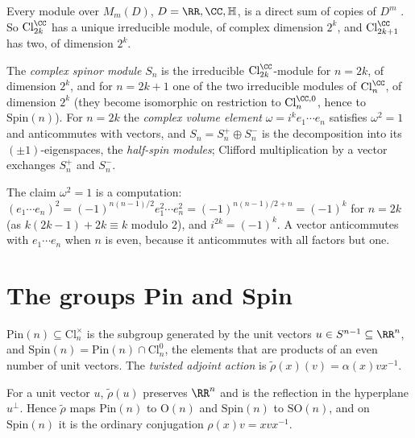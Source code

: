 Every module over $M_m(D)$, $D = \RR, \CC, \mathbb{H}$, is a direct sum of copies of $D^m$ \cite[Chapter I]{lawson-michelsohn}. So $\mathrm{Cl}^\CC_{2k}$ has a unique irreducible module, of complex dimension
$2^k$, and $\mathrm{Cl}^\CC_{2k+1}$ has two, of dimension $2^k$.

\begin{definition}\label{spin-geometry:definition-spinor-module}
The \emph{complex spinor module} $S_n$ is the irreducible $\mathrm{Cl}^\CC_{2k}$-module for $n = 2k$, of dimension $2^k$, and for $n = 2k + 1$ one of the two irreducible modules of $\mathrm{Cl}^\CC_n$, of dimension $2^k$ (they become isomorphic
on restriction to $\mathrm{Cl}^{\CC,0}_n$, hence to $\mathrm{Spin}(n)$). For $n = 2k$ the \emph{complex volume element} $\omega = i^ke_1\cdots e_n$ satisfies $\omega^2 = 1$ and anticommutes with vectors, and $S_n = S_n^+ \oplus S_n^-$ is the decomposition into its
$(\pm 1)$-eigenspaces, the \emph{half-spin modules}; Clifford multiplication by a vector exchanges $S^+_n$ and $S^-_n$.
\end{definition}

The claim $\omega^2 = 1$ is a computation: $(e_1\cdots e_n)^2 = (-1)^{n(n-1)/2}e_1^2\cdots e_n^2 = (-1)^{n(n-1)/2 + n} = (-1)^{k}$ for $n = 2k$ (as $k(2k - 1) + 2k \equiv k$ modulo $2$), and $i^{2k} = (-1)^k$. A vector
anticommutes with $e_1\cdots e_n$ when $n$ is even, because it anticommutes with all factors but one.

\section{The groups Pin and Spin}\label{spin-geometry:section-spin-groups}

\begin{definition}\label{spin-geometry:definition-pin-spin}
$\mathrm{Pin}(n) \subseteq \mathrm{Cl}_n^\times$ is the subgroup generated by the unit vectors $u \in S^{n-1} \subseteq \RR^n$, and $\mathrm{Spin}(n) = \mathrm{Pin}(n) \cap \mathrm{Cl}_n^0$, the elements that are
products of an even number of unit vectors. The \emph{twisted adjoint action} is $\tilde{\rho}(x)(v) = \alpha(x)vx^{-1}$.
\end{definition}

\begin{lemma}\label{spin-geometry:lemma-reflections}
For a unit vector $u$, $\tilde{\rho}(u)$ preserves $\RR^n$ and is the reflection in the hyperplane $u^\perp$. Hence $\tilde{\rho}$ maps $\mathrm{Pin}(n)$ to $\mathrm{O}(n)$ and $\mathrm{Spin}(n)$ to $\mathrm{SO}(n)$, and on
$\mathrm{Spin}(n)$ it is the ordinary conjugation $\rho(x)v = xvx^{-1}$.
\end{lemma}

